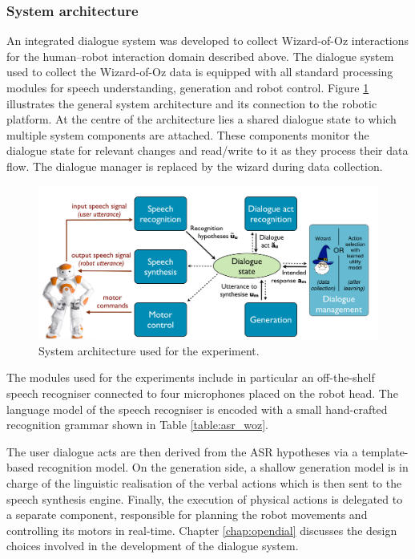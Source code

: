 \subsubsection*{System architecture}

An integrated dialogue system was developed to collect Wizard-of-Oz interactions for the human--robot interaction domain described above. The dialogue system used to collect the Wizard-of-Oz data is equipped with all standard processing modules for speech understanding, generation and robot control.  Figure \ref{fig:exp1_architecture} illustrates the general system architecture and its connection to the robotic platform. At the centre of the architecture lies a shared dialogue state to which multiple system components are attached. These components monitor the dialogue state for relevant changes and read/write to it as they process their data flow. The dialogue manager is replaced by the wizard during data collection. 

\begin{figure}[p]
\begin{center}
\includegraphics[scale=0.29]{imgs/exp1_architecture.pdf}
\end{center}
\caption{System architecture used for the experiment.}
\label{fig:exp1_architecture}
\end{figure}

The modules used for the experiments include in particular an off-the-shelf speech recogniser connected to four microphones placed on the robot head. The language model of the speech recogniser is encoded with a small hand-crafted recognition grammar shown in Table \ref{table:asr_woz}. 

The user dialogue acts are then derived from the ASR hypotheses via a template-based recognition model. On the generation side, a shallow generation model is in charge of the linguistic realisation of the verbal actions which is then sent to the speech synthesis engine.  Finally, the execution of physical actions is delegated to a separate component, responsible for planning the robot movements and controlling its motors in real-time.  Chapter \ref{chap:opendial} discusses the design choices involved in the development of the dialogue system.


